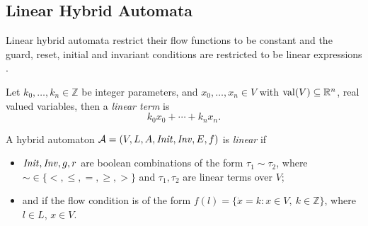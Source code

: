 \subsection{Linear Hybrid Automata}
Linear hybrid automata restrict their flow functions to be constant and the guard, reset, initial and invariant conditions are restricted to be linear expressions \cite{Alur1995a}.

\begin{defi}
Let $k_{0},\ldots,k_{n}\in \mathbb{Z}$ be integer parameters, and $x_{0},\ldots,x_{n}\in V$ with $\operatorname{val}(V)\subseteq \mathbb{R}^n$, real valued variables, then a \emph{linear term} is
\[
k_{0}x_{0} + \cdots + k_{n}x_{n}.
\]
\end{defi}

\begin{defi}
A hybrid automaton $\mathcal{A}=(V,L,A,\mathit{Init},\mathit{Inv},E,f)$ is \emph{linear} if
\begin{itemize}
    \item{$\mathit{Init}, \mathit{Inv}, g, r$ are boolean combinations of the form $\tau_{1} \sim \tau_{2}$, where $\sim\in\{<,\leq,=,\geq,>\}$ and $\tau_{1},\tau_{2}$ are linear terms over $V$;}
    \item{and if the flow condition is of the form $f(l)=\{\dot{x}=k : x\in V,\ k\in\mathbb{Z}\}$, where $l\in L$, $x\in V$.}
\end{itemize}
\end{defi}

